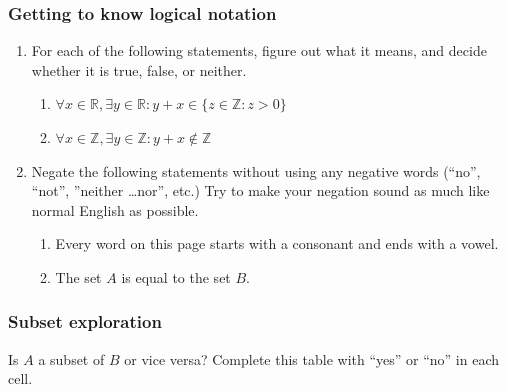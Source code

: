 \documentclass[11pt]{article}
\newcommand{\R}{\mathbb{R}}
\newcommand{\Z}{\mathbb{Z}}
\newcommand\st{:}
\theoremstyle{definition}
\begin{document}
\subsubsection{Getting to know logical notation}

\begin{enumerate}
\item For each of the following statements, figure out what it means, and decide whether it is true, false, or neither. 
	 \begin{enumerate}
	 \item $\forall x\in \R, \exists y\in \R \st y+x\in\{z\in \Z \st z > 0\}$
	 \item $\forall x\in \Z, \exists y\in \Z \st y+x\notin \Z$
	 \end{enumerate}
\item Negate the following statements without using any negative words (``no'', ``not'', ''neither \dots nor'', etc.) Try to make your negation sound as much like normal English as possible. 
	\begin{enumerate}
	\item Every word on this page starts with a consonant and ends with a vowel.
	\item The set $A$ is equal to the set $B$.
	\end{enumerate}
\end{enumerate}

\vfill


\newpage
\subsubsection{Subset exploration}
Is $A$ a subset of $B$ or vice versa? Complete this table with ``yes'' or ``no'' in each cell.
\end{document}
